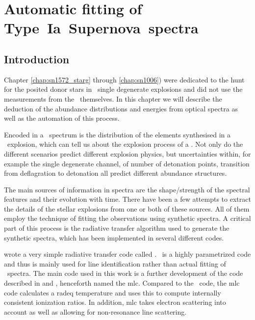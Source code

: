 \chapter{Automatic fitting of Type~Ia~Supernova~spectra}
\label{chap:dalek}
\section{Introduction}
\label{sec:dalek_intro}

Chapter \ref{chap:sn1572_starg} through \ref{chap:sn1006}) were dedicated to the hunt for the posited donor stars  in \snia\ single degenerate explosions  and did not use the measurements from the \sneia\ themselves. In this chapter we will describe the deduction of the abundance distributions and energies from optical spectra as well as the automation of this process.

Encoded in a \snia\ spectrum is the distribution of the elements synthesised in a \snia\ explosion, which can tell us about the explosion process of a \snia. Not only do the different scenarios predict different explosion physics, but uncertainties within, for example the single degenerate channel, of number of detonation points, transition from deflagration to detonation all predict different abundance structures.

The main sources of information in spectra are the shape/strength of the spectral features and their evolution with time. There have been a few attempts to extract the details of the stellar explosions from one or both of these sources. All of them employ the technique of fitting the observations using synthetic spectra. A critical part of this process is the radiative transfer algorithm used to generate the synthetic spectra, which has been implemented in several different codes.

\cite{2000PhDT.........6F} wrote a very simple radiative transfer code called \synow. \synow\ is a highly parametrized code and thus is mainly used for line identification rather than actual fitting of \snia\ spectra. 
The main code used in this work is a further development of the code described in \citet{1993A&A...279..447M}  and \citet{2000A&A...363..705M}, henceforth named the \gls{mlc}. Compared to the \synow\ code, the \gls{mlc} code calculates a \gls{radeq} temperature and uses this to compute internally consistent ionization ratios. In addition, \gls{mlc} takes electron scattering into account as well as allowing for non-resonance line scattering. 

